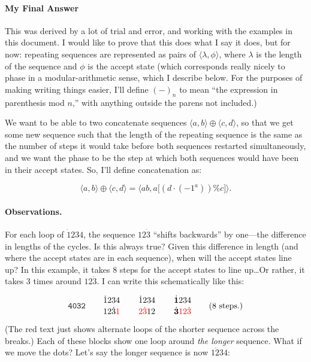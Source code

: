 \documentclass{article}
\begin{document}
\paragraph{My Final Answer} This was derived by a lot of trial and error,
 and working with the examples in this document. I would like to prove that this
 does what I say it does, but for now: repeating sequences are represented as
 pairs of $\langle \lambda, \phi \rangle$, where $\lambda$ is the length of
 the sequence and $\phi$ is the accept state (which corresponds really nicely
 to phase in a modular-arithmetic sense, which I describe below. For the
 purposes of making writing things easier, I'll define $(-)_n$ to mean ``the
 expression in parenthesis mod $n$,'' with anything outside the parens not
 included.)

 We want to be able to two concatenate sequences $\langle a, b \rangle \oplus
 \langle c, d \rangle$, so that we get some new sequence such that the
 length of the repeating sequence is the same as the number of steps it would
 take before both sequences restarted simultaneously, and we want the phase
 to be the step at which both sequences would have been in their accept
 states. So, I'll define concatenation as:

 \[
  \langle a, b \rangle \oplus \langle c, d \rangle =
  \langle ab, a \big[ (d \cdot (-1^a)) \% c \big] \rangle.
\]


\paragraph{Observations.} For each loop of $\dot{1}234$, the sequence $12\dot{3}$ ``shifts backwards'' by one---the difference in lengths of the cycles. Is this always true? \bullet{} Given this difference in length (and where the accept states are in each sequence), when will the accept states line up? \bullet{} In this example, it takes 8 steps for the accept states to line up\dots Or rather, it takes 3 times around $12\dot{3}$. I can write this schematically like this:

\[
  \texttt{4032} \qquad
  \SeqCompare{\dot{1}234}{12\dot{3}\textcolor{red}{1}} \qquad
  \SeqCompare{\dot{1}234}{\textcolor{red}{2\dot{3}}12} \qquad
  \SeqCompare{\dot{\mathbf{1}}234}{\dot{\mathbf{3}}\textcolor{red}{12\dot{3}}} \qquad
  \text{(8 steps.)}
\]

(The red text just shows alternate loops of the shorter sequence across the
breaks.) Each of these blocks show one loop around \emph{the longer} sequence. What if we move the dots? Let's say the longer sequence is now $1\dot{2}34$:
\end{document}
